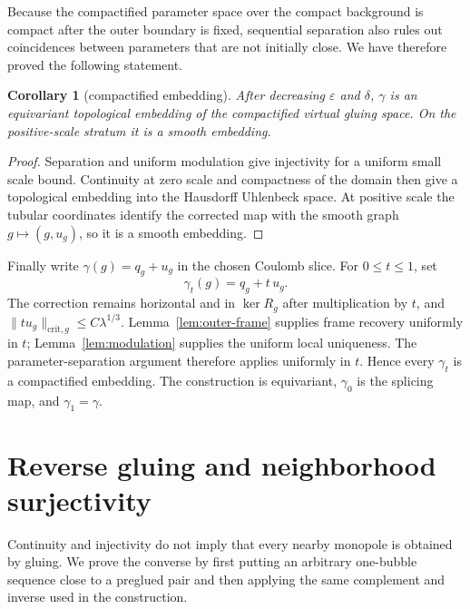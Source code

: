 \documentclass[11pt]{amsart}
\newtheorem{corollary}[theorem]{Corollary}
\theoremstyle{definition}
\theoremstyle{remark}
\theoremstyle{plain}
\begin{document}
Because the compactified parameter space over the compact background is
compact after the outer boundary is fixed, sequential separation also rules
out coincidences between parameters that are not initially close.  We have
therefore proved the following statement.

\begin{corollary}[compactified embedding]\label{cor:embedding}
After decreasing $\varepsilon$ and $\delta$, $\gamma$ is an equivariant
topological embedding of the compactified virtual gluing space.  On the
positive-scale stratum it is a smooth embedding.
\end{corollary}
\begin{proof}
Separation and uniform modulation give injectivity for a uniform small
scale bound.  Continuity at zero scale and compactness of the domain
then give a topological embedding into the Hausdorff Uhlenbeck space.
At positive scale the tubular coordinates identify the corrected map
with the smooth graph $g\mapsto(g,u_g)$, so it is a smooth embedding.
\end{proof}

Finally write $\gamma(g)=q_g+u_g$ in the chosen Coulomb slice.  For
$0\leq t\leq1$, set
\begin{equation}\label{eq:isotopy}
 \gamma_t(g)=q_g+t\,u_g.
\end{equation}
The correction remains horizontal and in $\ker R_g$ after multiplication
by $t$, and $\|t u_g\|_{\mathrm{crit},g}\leq C\lambda^{1/3}$.
Lemma~\ref{lem:outer-frame} supplies frame recovery uniformly in $t$;
Lemma~\ref{lem:modulation} supplies the uniform local uniqueness.
The parameter-separation argument therefore applies uniformly in $t$.  Hence every $\gamma_t$ is a compactified
embedding.  The construction is equivariant, $\gamma_0$ is the splicing
map, and $\gamma_1=\gamma$.

\section{Reverse gluing and neighborhood surjectivity}
\label{sec:reverse-gluing}

Continuity and injectivity do not imply that every nearby monopole is
obtained by gluing.  We prove the converse by first putting an arbitrary
one-bubble sequence close to a preglued pair and then applying the same
complement and inverse used in the construction.
\end{document}
